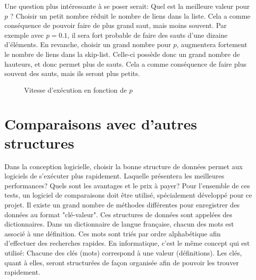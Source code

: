 \documentclass[hidelinks,a4paper, 12pt]{article}
\begin{document}
	Une question plus intéressante à se poser serait: Quel est la meilleure valeur pour $p$ ? Choisir un petit nombre réduit le nombre de liens dans la liste. Cela a comme conséquence de pouvoir faire de plus grand saut, mais moins souvent. Par exemple avec $p=0.1$, il sera fort probable de faire des sauts d'une dizaine d'éléments. En revanche, choisir un grand nombre pour $p$, augmentera fortement le nombre de liens dans la skip-list. Celle-ci possède donc un grand nombre de hauteurs, et donc permet plus de sauts. Cela a comme conséquence de faire plus souvent des sauts, mais ils seront plus petits.
	 
	\begin{figure}[h]
		\centering
		\caption{Vitesse d'exécution en fonction de $p$}
		\label{tbRes2}
	\end{figure}
	
	\section{Comparaisons avec d'autres structures}\label{compare}
	Dans la conception logicielle, choisir la bonne structure de données permet aux logiciels de s'exécuter plus rapidement. Laquelle présentera les meilleures performances? Quels sont les avantages et le prix à payer? Pour l'ensemble de ces tests, un logiciel de comparaisons doit être utilisé, spécialement développé pour ce projet.
	Il existe un grand nombre de méthodes différentes pour enregistrer des données au format "clé-valeur". Ces structures de données sont appelées des dictionnaires. Dans un dictionnaire de langue française, chacun des mots est associé à une définition. Ces mots sont triés par ordre alphabétique afin d'effectuer des recherches rapides. En informatique, c'est le même concept qui est utilisé: Chacune des clés (mots) correspond à une valeur (définitions). Les clés, quant à elles, seront structurées de façon organisée afin de pouvoir les trouver rapidement.
	
\end{document}
